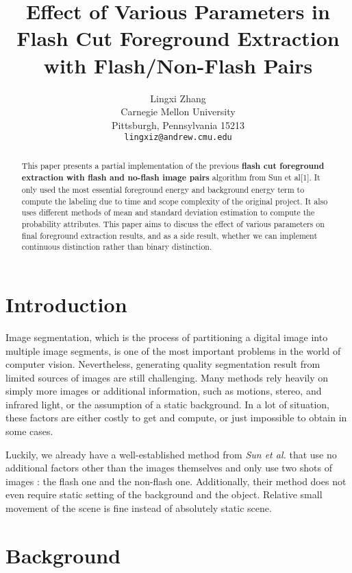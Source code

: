 \documentclass[final]{cvpr}
\author{Lingxi Zhang
\\ Carnegie Mellon University
\\ Pittsburgh, Pennsylvania 15213
\\ {\tt\small lingxiz@andrew.cmu.edu}
}
\title{Effect of Various Parameters in Flash Cut Foreground Extraction with Flash/Non-Flash Pairs}
\begin{document}
\maketitle


\begin{abstract}
   This paper presents a partial implementation of the previous 
   \textbf{flash cut foreground extraction with flash and no-flash image pairs} 
   algorithm from Sun et al[1]. It only used the most essential foreground energy
   and background energy term to compute the labeling due to time and scope 
   complexity of the original project. It also uses different methods of 
   mean and standard deviation estimation to compute the probability attributes. 
   This paper aims to discuss the effect of various parameters on final foreground 
   extraction results, and as a side result, whether we can implement continuous distinction 
   rather than binary distinction.

\end{abstract}

\section{Introduction}

Image segmentation, which is the process of partitioning a digital image into multiple 
image segments, is one of the most important problems in the world of 
computer vision. Nevertheless, generating quality segmentation result
from limited sources of images are still challenging. Many methods rely 
heavily on simply more images or additional information, such as motions, 
stereo, and infrared light, or the assumption of a static background.
In a lot of situation, these factors are either costly to get and compute, 
or just impossible to obtain in some cases. 

Luckily, we already have a 
well-established method from \textit{Sun et al.} that use no additional factors 
other than the images themselves and only use two shots of images : the flash
one and the non-flash one. Additionally, their method does not even require 
static setting of the background and the object. Relative small movement of the scene 
is fine instead of absolutely static scene.
\section{Background}
\end{document}
